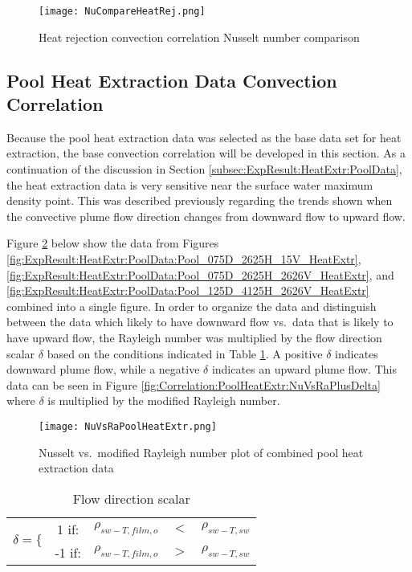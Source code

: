\begin{figure}
	\centering
	\texttt{[image: NuCompareHeatRej.png]}
	\caption{Heat rejection convection correlation Nusselt number comparison}
	\label{fig:Correlation:HeatRejComparison:NuCompare}
\end{figure}
			
\subsection{Pool Heat Extraction Data Convection Correlation}
\label{subsec:Correlation:PoolHeatExtr}

Because the pool heat extraction data was selected as the base data set for heat extraction, the base convection correlation will be developed in this section. As a continuation of the discussion in Section \ref{subsec:ExpResult:HeatExtr:PoolData}, the heat extraction data is very sensitive near the surface water maximum density point. This was described previously regarding the trends shown when the convective plume flow direction changes from downward flow to upward flow. 

Figure \ref{fig:Correlation:PoolHeatExtr:NuVsRa} below show the data from Figures \ref{fig:ExpResult:HeatExtr:PoolData:Pool_075D_2625H_15V_HeatExtr}, \ref{fig:ExpResult:HeatExtr:PoolData:Pool_075D_2625H_2626V_HeatExtr}, and \ref{fig:ExpResult:HeatExtr:PoolData:Pool_125D_4125H_2626V_HeatExtr} combined into a single figure. In order to organize the data and distinguish between the data which likely to have downward flow vs.\ data that is likely to have upward flow, the Rayleigh number was multiplied by the flow direction scalar $\delta$ based on the conditions indicated in Table \ref{tab:Correlation:PoolHeatExtr:FDS}. A positive $\delta$ indicates downward plume flow, while a negative $\delta$ indicates an upward plume flow. This data can be seen in Figure \ref{fig:Correlation:PoolHeatExtr:NuVsRaPlusDelta} where  $\delta$ is multiplied by the modified Rayleigh number. 

\begin{figure}
	\centering
	\texttt{[image: NuVsRaPoolHeatExtr.png]}
	\caption{Nusselt vs.\ modified Rayleigh number plot of combined pool heat extraction data}
	\label{fig:Correlation:PoolHeatExtr:NuVsRa}
\end{figure}

\begin{table}[h]
	\centering
	\caption{Flow direction scalar}
	\label{tab:Correlation:PoolHeatExtr:FDS}
	\begin{tabular}{r c r c l}
	\multirow{2}{*}{$\delta = \bigg\{$} & 1 if: & $\rho_{sw-T,film,o}$ & $<$ & $\rho_{sw-T,sw}$ \\
	 & -1 if: & $\rho_{sw-T,film,o}$ & $>$ & $\rho_{sw-T,sw}$ \\
	\end{tabular}
\end{table}
		
